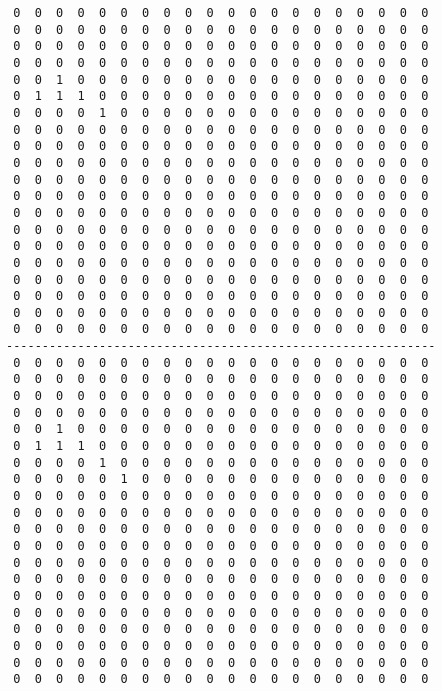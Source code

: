 \begin{verbatim}
 0  0  0  0  0  0  0  0  0  0  0  0  0  0  0  0  0  0  0  0
 0  0  0  0  0  0  0  0  0  0  0  0  0  0  0  0  0  0  0  0
 0  0  0  0  0  0  0  0  0  0  0  0  0  0  0  0  0  0  0  0
 0  0  0  0  0  0  0  0  0  0  0  0  0  0  0  0  0  0  0  0
 0  0  1  0  0  0  0  0  0  0  0  0  0  0  0  0  0  0  0  0
 0  1  1  1  0  0  0  0  0  0  0  0  0  0  0  0  0  0  0  0
 0  0  0  0  1  0  0  0  0  0  0  0  0  0  0  0  0  0  0  0
 0  0  0  0  0  0  0  0  0  0  0  0  0  0  0  0  0  0  0  0
 0  0  0  0  0  0  0  0  0  0  0  0  0  0  0  0  0  0  0  0
 0  0  0  0  0  0  0  0  0  0  0  0  0  0  0  0  0  0  0  0
 0  0  0  0  0  0  0  0  0  0  0  0  0  0  0  0  0  0  0  0
 0  0  0  0  0  0  0  0  0  0  0  0  0  0  0  0  0  0  0  0
 0  0  0  0  0  0  0  0  0  0  0  0  0  0  0  0  0  0  0  0
 0  0  0  0  0  0  0  0  0  0  0  0  0  0  0  0  0  0  0  0
 0  0  0  0  0  0  0  0  0  0  0  0  0  0  0  0  0  0  0  0
 0  0  0  0  0  0  0  0  0  0  0  0  0  0  0  0  0  0  0  0
 0  0  0  0  0  0  0  0  0  0  0  0  0  0  0  0  0  0  0  0
 0  0  0  0  0  0  0  0  0  0  0  0  0  0  0  0  0  0  0  0
 0  0  0  0  0  0  0  0  0  0  0  0  0  0  0  0  0  0  0  0
 0  0  0  0  0  0  0  0  0  0  0  0  0  0  0  0  0  0  0  0
------------------------------------------------------------
 0  0  0  0  0  0  0  0  0  0  0  0  0  0  0  0  0  0  0  0
 0  0  0  0  0  0  0  0  0  0  0  0  0  0  0  0  0  0  0  0
 0  0  0  0  0  0  0  0  0  0  0  0  0  0  0  0  0  0  0  0
 0  0  0  0  0  0  0  0  0  0  0  0  0  0  0  0  0  0  0  0
 0  0  1  0  0  0  0  0  0  0  0  0  0  0  0  0  0  0  0  0
 0  1  1  1  0  0  0  0  0  0  0  0  0  0  0  0  0  0  0  0
 0  0  0  0  1  0  0  0  0  0  0  0  0  0  0  0  0  0  0  0
 0  0  0  0  0  1  0  0  0  0  0  0  0  0  0  0  0  0  0  0
 0  0  0  0  0  0  0  0  0  0  0  0  0  0  0  0  0  0  0  0
 0  0  0  0  0  0  0  0  0  0  0  0  0  0  0  0  0  0  0  0
 0  0  0  0  0  0  0  0  0  0  0  0  0  0  0  0  0  0  0  0
 0  0  0  0  0  0  0  0  0  0  0  0  0  0  0  0  0  0  0  0
 0  0  0  0  0  0  0  0  0  0  0  0  0  0  0  0  0  0  0  0
 0  0  0  0  0  0  0  0  0  0  0  0  0  0  0  0  0  0  0  0
 0  0  0  0  0  0  0  0  0  0  0  0  0  0  0  0  0  0  0  0
 0  0  0  0  0  0  0  0  0  0  0  0  0  0  0  0  0  0  0  0
 0  0  0  0  0  0  0  0  0  0  0  0  0  0  0  0  0  0  0  0
 0  0  0  0  0  0  0  0  0  0  0  0  0  0  0  0  0  0  0  0
 0  0  0  0  0  0  0  0  0  0  0  0  0  0  0  0  0  0  0  0
 0  0  0  0  0  0  0  0  0  0  0  0  0  0  0  0  0  0  0  0
\end{verbatim}
\pagebreak
